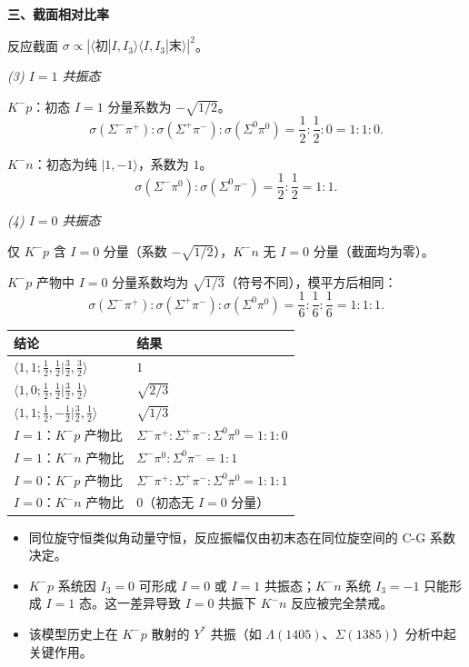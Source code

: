 \begin{derivationbox}[标准解题过程]
\textbf{三、截面相对比率}

反应截面 $\sigma\propto|\langle\text{初}|I,I_3\rangle\langle I,I_3|\text{末}\rangle|^2$。

\textit{(3) $I=1$ 共振态}

$K^-p$：初态 $I=1$ 分量系数为 $-\sqrt{1/2}$。
\begin{equation}
\sigma(\Sigma^-\pi^+):\sigma(\Sigma^+\pi^-):\sigma(\Sigma^0\pi^0)=\frac12:\frac12:0=\boxed{1:1:0}.
\end{equation}

$K^-n$：初态为纯 $|1,-1\rangle$，系数为 $1$。
\begin{equation}
\sigma(\Sigma^-\pi^0):\sigma(\Sigma^0\pi^-)=\frac12:\frac12=\boxed{1:1}.
\end{equation}

\textit{(4) $I=0$ 共振态}

仅 $K^-p$ 含 $I=0$ 分量（系数 $-\sqrt{1/2}$），$K^-n$ 无 $I=0$ 分量（截面均为零）。

$K^-p$ 产物中 $I=0$ 分量系数均为 $\sqrt{1/3}$（符号不同），模平方后相同：
\begin{equation}
\sigma(\Sigma^-\pi^+):\sigma(\Sigma^+\pi^-):\sigma(\Sigma^0\pi^0)=\frac16:\frac16:\frac16=\boxed{1:1:1}.
\end{equation}
\end{derivationbox}

\begin{formulabox}[答案汇总]
\begin{center}
\begin{tabular}{ll}
\toprule
\textbf{结论} & \textbf{结果} \\
\midrule
$\langle1,1;\frac12,\frac12|\frac32,\frac32\rangle$ & $1$ \\
$\langle1,0;\frac12,\frac12|\frac32,\frac12\rangle$ & $\sqrt{2/3}$ \\
$\langle1,1;\frac12,-\frac12|\frac32,\frac12\rangle$ & $\sqrt{1/3}$ \\
$I=1$：$K^-p$ 产物比 & $\Sigma^-\pi^+:\Sigma^+\pi^-:\Sigma^0\pi^0=1:1:0$ \\
$I=1$：$K^-n$ 产物比 & $\Sigma^-\pi^0:\Sigma^0\pi^-=1:1$ \\
$I=0$：$K^-p$ 产物比 & $\Sigma^-\pi^+:\Sigma^+\pi^-:\Sigma^0\pi^0=1:1:1$ \\
$I=0$：$K^-n$ 产物比 & $0$（初态无 $I=0$ 分量） \\
\bottomrule
\end{tabular}
\end{center}
\end{formulabox}

\begin{insightbox}[物理图像]
\begin{itemize}
    \item 同位旋守恒类似角动量守恒，反应振幅仅由初末态在同位旋空间的 C-G 系数决定。
    \item $K^-p$ 系统因 $I_3=0$ 可形成 $I=0$ 或 $I=1$ 共振态；$K^-n$ 系统 $I_3=-1$ 只能形成 $I=1$ 态。这一差异导致 $I=0$ 共振下 $K^-n$ 反应被完全禁戒。
    \item 该模型历史上在 $K^-p$ 散射的 $Y^*$ 共振（如 $\Lambda(1405)$、$\Sigma(1385)$）分析中起关键作用。
\end{itemize}
\end{insightbox}
